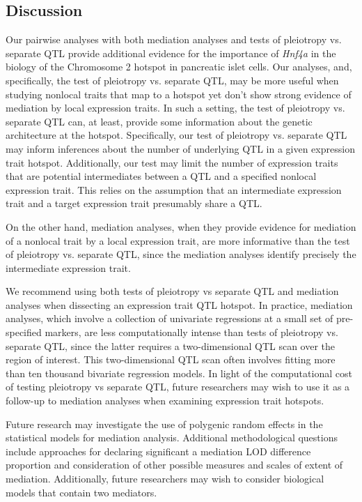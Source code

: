 \documentclass{book}
\begin{document}
\subsection{Discussion}

Our pairwise analyses with both mediation analyses and tests of pleiotropy vs. separate QTL provide additional evidence for the importance of \emph{Hnf4a} in the biology of the Chromosome 2 hotspot in pancreatic islet cells. Our analyses, and, specifically, the test of pleiotropy vs. separate QTL, may be more useful when studying nonlocal traits that map to a hotspot yet don't show strong evidence of mediation by local expression traits. In such a setting, the test of pleiotropy vs. separate QTL can, at least, provide some information about the genetic architecture at the hotspot. Specifically, our test of pleiotropy vs. separate QTL may inform inferences about the number of underlying QTL in a given expression trait hotspot. Additionally, our test may limit the number of expression traits that are potential intermediates between a QTL and a specified nonlocal expression trait. This relies on the assumption that an intermediate expression trait and a target expression trait presumably share a QTL.

On the other hand, mediation analyses, when they provide evidence for mediation of a nonlocal trait by a local expression trait, are more informative than the test of pleiotropy vs. separate QTL, since the mediation analyses identify precisely the intermediate expression trait.

We recommend using both tests of pleiotropy vs separate QTL and mediation analyses when dissecting an expression trait QTL hotspot. In practice, mediation analyses, which involve a collection of univariate regressions at a small set of pre-specified markers, are less computationally intense than tests of pleiotropy vs. separate QTL, since the latter requires a two-dimensional QTL scan over the region of interest. This two-dimensional QTL scan often involves fitting more than ten thousand bivariate regression models. In light of the computational cost of testing pleiotropy vs separate QTL, future researchers may wish to use it as a follow-up to mediation analyses when examining expression trait hotspots.

Future research may investigate the use of polygenic random effects in the statistical models for mediation analysis. Additional methodological questions include approaches for declaring significant a mediation LOD difference proportion and consideration of other possible measures and scales of extent of mediation. Additionally, future researchers may wish to consider biological models that contain two mediators.
\end{document}
